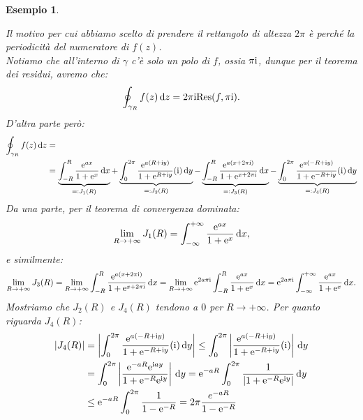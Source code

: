 \documentclass[11pt]{book}
\theoremstyle{Definizione}
\theoremstyle{TeoremaProposizioneLemmaCorollarioCongettura}
\theoremstyle{OsservazioneNotaEsempio}
\newtheorem{myes}{Esempio}[section]
\renewcommand{\i}{\textup{i}}
\newcommand{\e}{\textup{e}}
\renewcommand{\d}{\mathrm{d}}
\newcommand{\dz}{\,\d z}
\newcommand{\dx}{\,\d x}
\newcommand{\dy}{\,\d y}
\newcommand{\Res}{\textup{Res}}
\newcommand{\frecciaIn}{
\tikz \draw[-latex] (-1pt,0) -- (1pt,0);
}
\begin{document}
\begin{myes}
\begin{center}
\end{center}
Il motivo per cui abbiamo scelto di prendere il rettangolo di altezza $2\pi$ è perché la periodicità del numeratore di $f(z)$.\\
Notiamo che all'interno di $\gamma$ c'è solo un polo di $f$, ossia $\pi\i$, dunque per il teorema dei residui, avremo che:
$$
\oint_{\gamma_R} f(z)\dz = 2\pi\i\Res(f,\pi\i).
$$
D'altra parte però:
\begin{align*}
\oint_{\gamma_R} f(z)\dz &= \\
&=\underbrace{\int_{-R}^{R} \frac{\e^{ax}}{1+\e^{x}}\dx}_{=:J_1(R)} + \underbrace{\int_{0}^{2\pi} \frac{\e^{a(R+\i y)}}{1+\e^{R+\i y}}(\i)\dy}_{=:J_2(R)} -\underbrace{\int_{-R}^{R} \frac{\e^{a(x+2\pi\i)}}{1+\e^{x+2\pi\i}}\dx}_{=:J_3(R)} - \underbrace{\int_{0}^{2\pi} \frac{\e^{a(-R+\i y)}}{1+\e^{-R+\i y}}(\i)\dy}_{=: J_4(R)}
\end{align*}
Da una parte, per il teorema di convergenza dominata:
$$
\lim_{R \to +\infty} J_1(R) = \int_{-\infty}^{+\infty} \frac{\e^{ax}}{1+\e^{x}}\dx,
$$
e similmente:
$$
\lim_{R \to +\infty} J_3(R) = \lim_{R \to +\infty} \int_{-R}^{R} \frac{\e^{a(x+2\pi\i)}}{1+\e^{x+2\pi\i}}\dx = \lim_{R \to +\infty} \e^{2a\pi\i}\int_{-R}^{R} \frac{\e^{ax}}{1+\e^{x}}\dx = \e^{2a\pi\i} \int_{-\infty}^{+\infty} \frac{\e^{ax}}{1+\e^{x}}\dx. 
$$
Mostriamo che $J_2(R)$ e $J_4(R)$ tendono a $0$ per $R \to +\infty$. Per quanto riguarda $J_4(R)$:
\begin{align*}
 |J_4(R)| &=  \left|\int_{0}^{2\pi} \frac{\e^{a(-R+\i y)}}{1+\e^{-R+\i y}}(\i)\dy\right| \leq  \int_{0}^{2\pi}\left|\frac{\e^{a(-R+\i y)}}{1+\e^{-R+\i y}}(\i)\right| \dy\\
&=  \int_{0}^{2\pi} \left|\frac{\e^{-aR}\e^{\i a y}}{1+\e^{-R}\e^{\i y}}\right|\dy =  \e^{-a R} \int_{0}^{2\pi} \frac{1}{|1+\e^{-R}\e^{\i y}|} \dy \\
&\leq  \e^{-a R} \int_0^{2\pi} \frac{1}{1-\e^{-R}} = 2\pi \frac{e^{-aR}}{1-\e^{-R}} 
\end{align*}

\end{myes}
\end{document}
